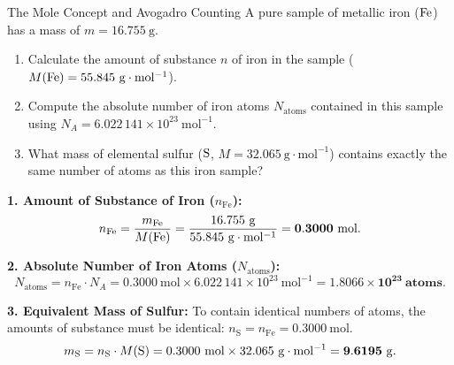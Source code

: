 \begin{exercise}{The Mole Concept and Avogadro Counting}
A pure sample of metallic iron ($\ce{Fe}$) has a mass of $m = 16.755\ \mathrm{g}$.
\begin{enumerate}[leftmargin=1.5em,itemsep=2pt]
  \item Calculate the amount of substance $n$ of iron in the sample ($M(\ce{Fe}) = 55.845\ \mathrm{g\cdot mol^{-1}}$).
  \item Compute the absolute number of iron atoms $N_{\text{atoms}}$ contained in this sample using $N_A = 6.022\,141 \times 10^{23}\ \mathrm{mol^{-1}}$.
  \item What mass of elemental sulfur ($\ce{S}$, $M = 32.065\ \mathrm{g\cdot mol^{-1}}$) contains exactly the same number of atoms as this iron sample?
\end{enumerate}
\end{exercise}

\begin{tabletworkspace}[5.0cm]
\end{tabletworkspace}

\begin{solution}
\textbf{1. Amount of Substance of Iron ($n_{\text{Fe}}$):}
\[
n_{\text{Fe}} = \frac{m_{\text{Fe}}}{M(\ce{Fe})} = \frac{16.755\ \mathrm{g}}{55.845\ \mathrm{g\cdot mol^{-1}}} = \mathbf{0.3000\ \mathrm{mol}}.
\]

\textbf{2. Absolute Number of Iron Atoms ($N_{\text{atoms}}$):}
\[
N_{\text{atoms}} = n_{\text{Fe}} \cdot N_A = 0.3000\ \mathrm{mol} \times 6.022\,141 \times 10^{23}\ \mathrm{mol^{-1}} = \mathbf{1.8066 \times 10^{23}\ \text{atoms}}.
\]

\textbf{3. Equivalent Mass of Sulfur:}
To contain identical numbers of atoms, the amounts of substance must be identical: $n_{\text{S}} = n_{\text{Fe}} = 0.3000\ \mathrm{mol}$.
\[
m_{\text{S}} = n_{\text{S}} \cdot M(\ce{S}) = 0.3000\ \mathrm{mol} \times 32.065\ \mathrm{g\cdot mol^{-1}} = \mathbf{9.6195\ \mathrm{g}}.
\]
\end{solution}

